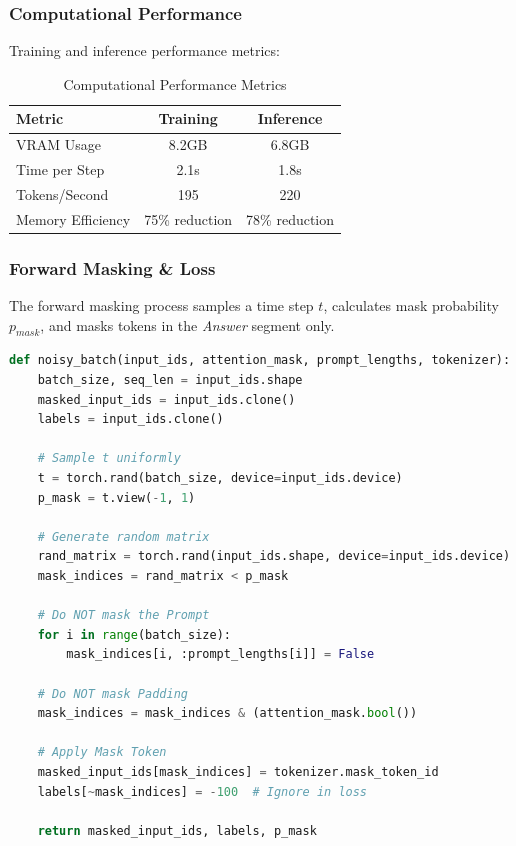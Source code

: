 \documentclass[a4paper,12pt]{article}
\begin{document}
\subsubsection*{Computational Performance}
Training and inference performance metrics:

\begin{table}[H]
    \centering
    \begin{tabular}{lcc}
        \toprule
        \textbf{Metric} & \textbf{Training} & \textbf{Inference} \\
        \midrule
        VRAM Usage & 8.2GB & 6.8GB \\
        Time per Step & 2.1s & 1.8s \\
        Tokens/Second & 195 & 220 \\
        Memory Efficiency & 75\% reduction & 78\% reduction \\
        \bottomrule
    \end{tabular}
    \caption{Computational Performance Metrics}
\end{table}

\subsubsection*{Forward Masking \& Loss}
The forward masking process samples a time step $t$, calculates mask probability $p_{mask}$, and masks tokens in the \textit{Answer} segment only.

\begin{lstlisting}[language=Python, caption=Masking Logic Snippet]
def noisy_batch(input_ids, attention_mask, prompt_lengths, tokenizer):
    batch_size, seq_len = input_ids.shape
    masked_input_ids = input_ids.clone()
    labels = input_ids.clone()
    
    # Sample t uniformly
    t = torch.rand(batch_size, device=input_ids.device)
    p_mask = t.view(-1, 1) 
    
    # Generate random matrix
    rand_matrix = torch.rand(input_ids.shape, device=input_ids.device)
    mask_indices = rand_matrix < p_mask
    
    # Do NOT mask the Prompt
    for i in range(batch_size):
        mask_indices[i, :prompt_lengths[i]] = False
        
    # Do NOT mask Padding
    mask_indices = mask_indices & (attention_mask.bool())

    # Apply Mask Token
    masked_input_ids[mask_indices] = tokenizer.mask_token_id
    labels[~mask_indices] = -100  # Ignore in loss
    
    return masked_input_ids, labels, p_mask
\end{lstlisting}
\end{document}
